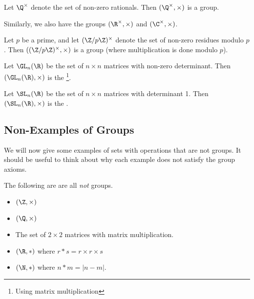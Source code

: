 \begin{example}
	Let $\Q^\times$ denote the set of non-zero rationals. Then $(\Q^\times, \times)$ is a group.
\end{example}
Similarly, we also have the groups $(\R^\times, \times)$ and $(\C^\times, \times)$.

\begin{example}
	Let $p$ be a prime, and let $(\Z / p \Z)^\times$ denote the set of non-zero residues modulo $p$. Then $((\Z / p \Z)^\times, \times)$ is a group (where multiplication is done modulo $p$).
\end{example}

\begin{example}
	Let $\GL_n(\R)$ be the set of $n \times n$ matrices with non-zero determinant. Then $(\GL_n(\R), \times)$ is the \footnote{Using matrix multiplication}.
\end{example}

\begin{example}
	Let $\SL_n(\R)$ be the set of $n \times n$ matrices with determinant 1. Then $(\SL_n(\R), \times)$ is the .
\end{example}

\subsection*{Non-Examples of Groups}

We will now give some examples of sets with operations that are not groups. It should be useful to think about why each example does not satisfy the group axioms.

\begin{example}
	The following are are all \emph{not} groups.
	\begin{itemize}
		\item $(\Z, \times)$
		\item $(\Q, \times)$
		\item The set of $2\times 2$ matrices with matrix multiplication.
		\item $(\R, *)$ where $r  * s = r\times r \times s$
		\item $(\N, *)$ where $n * m = |n - m|$.
	\end{itemize}
\end{example}



